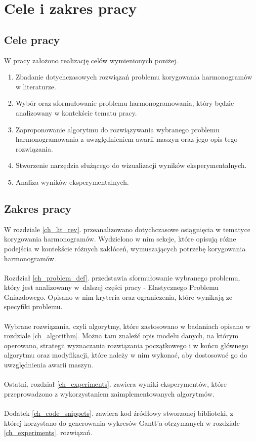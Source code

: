 \documentclass[archivemode]{mgr}
\begin{document}
\chapter*{Cele i zakres pracy}
\section*{Cele pracy}
W pracy założono realizację celów wymienionych poniżej.
\begin{enumerate}
	\item Zbadanie dotychczasowych rozwiązań problemu korygowania harmonogramów w literaturze.
	\item Wybór oraz sformułowanie problemu harmonogramowania, który będzie analizowany w kontekście tematu pracy.
	\item Zaproponowanie algorytmu do rozwiązywania wybranego problemu harmonogramowania z uwzględnieniem awarii maszyn oraz jego opis tego rozwiązania.
	\item Stworzenie narzędzia służącego do wizualizacji wyników eksperymentalnych.
	\item Analiza wyników eksperymentalnych.
\end{enumerate}
\section*{Zakres pracy}
W rozdziale \ref{ch_lit_rev}. przeanalizowano dotychczasowe osiągnięcia w tematyce korygowania harmonogramów. Wydzielono w nim sekcje, które opisują różne podejścia w kontekście różnych zakłóceń, wymuszających potrzebę korygowania harmonogramów.\\\\
Rozdział \ref{ch_problem_def}. przedstawia sformułowanie wybranego problemu, który jest analizowany w~dalszej części pracy - Elastycznego Problemu Gniazdowego. Opisano w nim kryteria oraz ograniczenia, które wynikają ze specyfiki problemu.\\\\
Wybrane rozwiązania, czyli algorytmy, które zastosowano w badaniach opisano w rozdziale \ref{ch_algorithm}. Można tam znaleźć opis modelu danych, na którym operowano, strategii wyznaczania rozwiązania początkowego i w końcu głównego algorytmu oraz modyfikacji, które należy w nim wykonać, aby dostosować go do uwzględnienia awarii maszyn.\\\\
Ostatni, rozdział \ref{ch_experiments}. zawiera wyniki eksperymentów, które przeprowadzono z wykorzystaniem zaimplementowanych algorytmów.\\\\
Dodatek \ref{ch_code_snippets}. zawiera kod źródłowy stworzonej biblioteki, z której korzystano do generowania wykresów Gantt'a otrzymanych w rozdziale \ref{ch_experiments}. rozwiązań.
%
\end{document}
